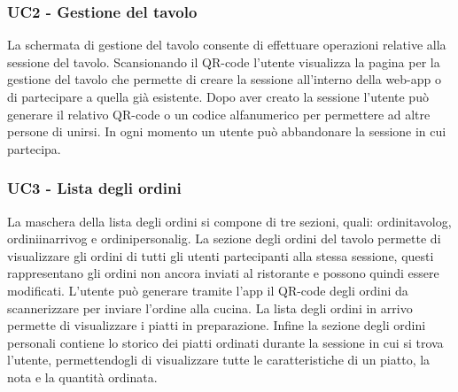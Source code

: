 \subsubsection{UC2 - Gestione del tavolo}
La schermata di gestione del tavolo consente di effettuare operazioni relative alla sessione del tavolo. Scansionando il QR-code l'utente visualizza la pagina per la gestione del tavolo che permette di creare la sessione all'interno della web-app o di partecipare a quella già esistente. Dopo aver creato la sessione l'utente può generare il relativo QR-code o un codice alfanumerico per permettere ad altre persone di unirsi. In ogni momento un utente può abbandonare la sessione in cui partecipa.
\subsubsection{UC3 - Lista degli ordini}
La maschera della lista degli ordini si compone di tre sezioni, quali: \gls{ordinitavolog}, \gls{ordiniinarrivog} e \gls{ordinipersonalig}.
La sezione degli ordini del tavolo permette di visualizzare gli ordini di tutti gli utenti partecipanti alla stessa sessione, questi rappresentano gli ordini non ancora inviati al ristorante e possono quindi essere modificati. L'utente può generare tramite l'app il QR-code degli ordini da scannerizzare per inviare l'ordine alla cucina.
La lista degli ordini in arrivo permette di visualizzare i piatti in preparazione.
Infine la sezione degli ordini personali contiene lo storico dei piatti ordinati durante la sessione in cui si trova l'utente, permettendogli di visualizzare tutte le caratteristiche di un piatto, la nota e la quantità ordinata.

